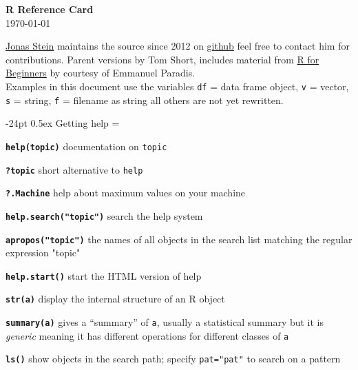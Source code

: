 \documentclass[8pt,landscape]{article}
\makeatletter
\renewcommand\section{\@startsection{section}{1}{0mm}%
                                     {-24pt}%
                                     {0.5ex}%
                                {\color{blue}\normalfont\large\bfseries}}
\newcommand{\code}{\texttt}
\newcommand{\bcode}[1]{\texttt{\textbf{#1}}}
\makeatother
\begin{document}
\footnotesize
\begin{multicols*}{3}

\setlength{\premulticols}{1pt}
\setlength{\postmulticols}{1pt}
\setlength{\multicolsep}{1pt}
\setlength{\columnsep}{2pt}

\begin{center}
     {\Large{\textbf{\color{blue}R Reference Card}}} \\
 \today
\end{center}
\href{mailto:news@jonasstein.de}{Jonas Stein} maintains 
the source since 2012 on \href{https://github.com/jonasstein/R-Reference-Card}{github} feel free to contact him for contributions.
Parent versions by Tom Short, includes material from 
\href{http://cran.r-project.org/doc/contrib/Paradis-rdebuts_en.pdf}{R for Beginners} 
by courtesy of Emmanuel Paradis.\\

Examples in this document use the variables \code{df} = data frame object, \code{v} = vector, \code{s} = string,  \code{f} = filename as string all others are not yet rewritten.

\section{Getting help}
\everypar={\hangindent=9mm}

\bcode{help(topic)} documentation on \code{topic} 

\bcode{?topic} short alternative to \code{help}

\bcode{?.Machine} help about maximum values on your machine

\bcode{help.search("topic")} search the help system 

\bcode{apropos("topic")} the names of all objects in the search list
matching the regular expression "topic"

\bcode{help.start()} start the HTML version of help

\bcode{str(a)} display the internal structure of an R object

\bcode{summary(a)} gives a ``summary'' of \code{a}, usually a
statistical summary but it is \emph{generic} meaning it has different operations for different
classes of \code{a}

\bcode{ls()} show objects in the search path; specify \code{pat="pat"}
to search on a pattern


\end{multicols*}
\end{document}
